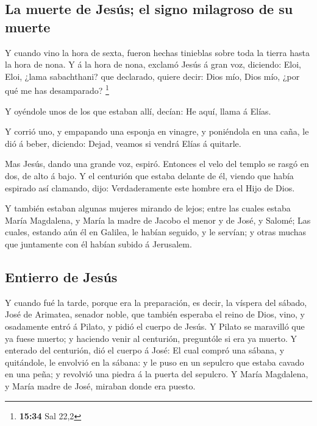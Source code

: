 \hypertarget{la-muerte-de-jesuxfas-el-signo-milagroso-de-su-muerte}{%
\subsection{La muerte de Jesús; el signo milagroso de su
muerte}\label{la-muerte-de-jesuxfas-el-signo-milagroso-de-su-muerte}}

 Y cuando vino la hora de sexta, fueron hechas tinieblas
sobre toda la tierra hasta la hora de nona.  Y á la hora
de nona, exclamó Jesús á gran voz, diciendo: Eloi, Eloi, ¿lama
sabachthani? que declarado, quiere decir: Dios mío, Dios mío, ¿por qué
me has desamparado? \footnote{\textbf{15:34} Sal 22,2}

 Y oyéndole unos de los que estaban allí, decían: He
aquí, llama á Elías.

 Y corrió uno, y empapando una esponja en vinagre, y
poniéndola en una caña, le dió á beber, diciendo: Dejad, veamos si
vendrá Elías á quitarle.

 Mas Jesús, dando una grande voz, espiró. 
Entonces el velo del templo se rasgó en dos, de alto á bajo.
 Y el centurión que estaba delante de él, viendo que
había espirado así clamando, dijo: Verdaderamente este hombre era el
Hijo de Dios.

 Y también estaban algunas mujeres mirando de lejos;
entre las cuales estaba María Magdalena, y María la madre de Jacobo el
menor y de José, y Salomé;  Las cuales, estando aún él en
Galilea, le habían seguido, y le servían; y otras muchas que juntamente
con él habían subido á Jerusalem.

\hypertarget{entierro-de-jesuxfas}{%
\subsection{Entierro de Jesús}\label{entierro-de-jesuxfas}}

 Y cuando fué la tarde, porque era la preparación, es
decir, la víspera del sábado,  José de Arimatea, senador
noble, que también esperaba el reino de Dios, vino, y osadamente entró á
Pilato, y pidió el cuerpo de Jesús.  Y Pilato se
maravilló que ya fuese muerto; y haciendo venir al centurión, preguntóle
si era ya muerto.  Y enterado del centurión, dió el
cuerpo á José:  El cual compró una sábana, y quitándole,
le envolvió en la sábana: y le puso en un sepulcro que estaba cavado en
una peña; y revolvió una piedra á la puerta del sepulcro.
 Y María Magdalena, y María madre de José, miraban donde
era puesto.


